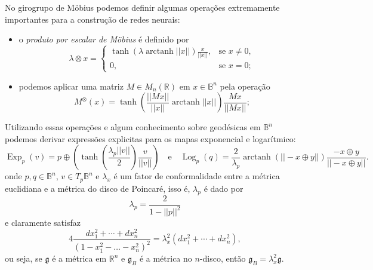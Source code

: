 \documentclass{article}
\DeclareMathOperator{\Exp}{Exp}
\DeclareMathOperator{\arctanh}{arctanh}
\DeclareMathOperator{\Log}{Log}
\begin{document}
No girogrupo de Möbius podemos definir algumas operações extremamente importantes para a construção de redes neurais: \begin{itemize}
    \item o \textit{produto por escalar de Möbius} é definido por \begin{equation}
        \lambda \otimes x = \begin{cases}
            \tanh(\lambda \arctanh ||x||)\frac{x}{||x||}, &\text{se } x \neq 0, \\ 0, &\text{se } x = 0;
        \end{cases}
    \end{equation}

    \item podemos aplicar uma matriz $M \in M_n(\mathbb{R})$ em $x \in \mathbb{B}^n$ pela operação \begin{equation}
        M^\otimes(x) = \tanh\left(\frac{||Mx||}{||x||}\arctanh ||x||\right)\frac{Mx}{||Mx||};
    \end{equation}
\end{itemize}

Utilizando essas operações e algum conhecimento sobre geodésicas em $\mathbb{B}^n$ podemos derivar expressões explicitas para os mapas exponencial e logarítmico: \begin{equation}
    \Exp_p(v) = p \oplus \left(\tanh\left(\frac{\lambda_p||v||}{2}\right)\frac{v}{||v||}\right) \quad \text{e} \quad \Log_p(q) = \frac{2}{\lambda_p}\arctanh(||-x \oplus y||)\frac{-x \oplus y}{||-x \oplus y||}.
\end{equation} onde $p, q \in \mathbb{B}^n$, $v \in T_p\mathbb{B}^n$ e $\lambda_x$ é um fator de conformalidade entre a métrica euclidiana e a métrica do disco de Poincaré, isso é, $\lambda_p$ é dado por \begin{equation}
    \lambda_p = \frac{2}{1 - ||p||^2}
\end{equation} e claramente satisfaz \begin{equation}
    4\frac{dx_1^2 + \cdots + dx_n^2}{(1 - x_1^2 - \dots - x_n^2)^2} = \lambda_x^2(dx_1^2 + \cdots + dx_n^2),
\end{equation} ou seja, se $\mathfrak{g}$ é a métrica em $\mathbb{R}^n$ e $\mathfrak{g}_B$ é a métrica no $n$-disco, então $\mathfrak{g}_B = \lambda_x^2 \mathfrak{g}$.     
\end{document}
